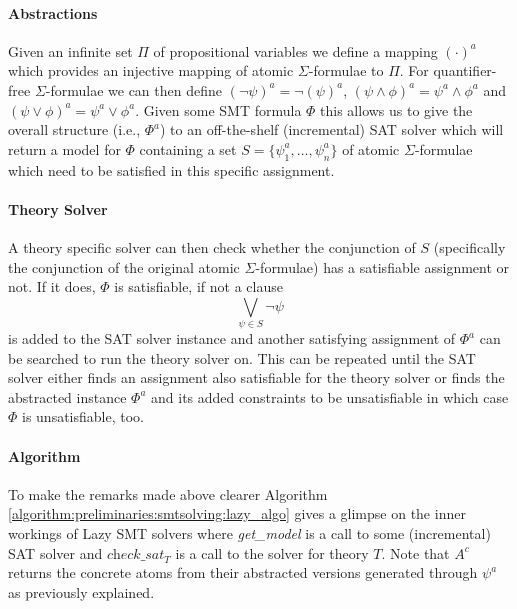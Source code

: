 \paragraph{Abstractions}
Given an infinite set $\Pi$ of propositional variables we define a mapping $(\cdot)^a$ which provides an injective mapping of atomic $\Sigma$-formulae to $\Pi$. For quantifier-free $\Sigma$-formulae we can then define $\left(\neg\psi\right)^a=\neg\left(\psi\right)^a$, $\left(\psi\land\phi\right)^a=\psi^a\land\phi^a$ and $\left(\psi\lor\phi\right)^a=\psi^a\lor\phi^a$. Given some SMT formula $\Phi$ this allows us to give the overall structure (i.e., $\Phi^a$) to an off-the-shelf (incremental) SAT solver which will return a model for $\Phi$ containing a set $S=\{\psi_1^a,\dots,\psi_n^a\}$ of atomic $\Sigma$-formulae which need to be satisfied in this specific assignment.

\paragraph{Theory Solver}
A theory specific solver can then check whether the conjunction of $S$ (specifically the conjunction of the original atomic $\Sigma$-formulae) has a satisfiable assignment or not. If it does, $\Phi$ is satisfiable, if not a clause \[\bigvee\limits_{\psi\in S} \neg\psi\] is added to the SAT solver instance and another satisfying assignment of $\Phi^a$ can be searched to run the theory solver on. This can be repeated until the SAT solver either finds an assignment also satisfiable for the theory solver or finds the abstracted instance $\Phi^a$ and its added constraints to be unsatisfiable in which case $\Phi$ is unsatisfiable, too.

\paragraph{Algorithm}
To make the remarks made above clearer Algorithm \ref{algorithm:preliminaries:smtsolving:lazy_algo} gives a glimpse on the inner workings of Lazy SMT solvers where \textit{get\_model} is a call to some (incremental) SAT solver and $\textit{check\_sat}_T$ is a call to the solver for theory $T$.
Note that $A^c$ returns the concrete atoms from their abstracted versions generated through $\psi^a$ as previously explained.

